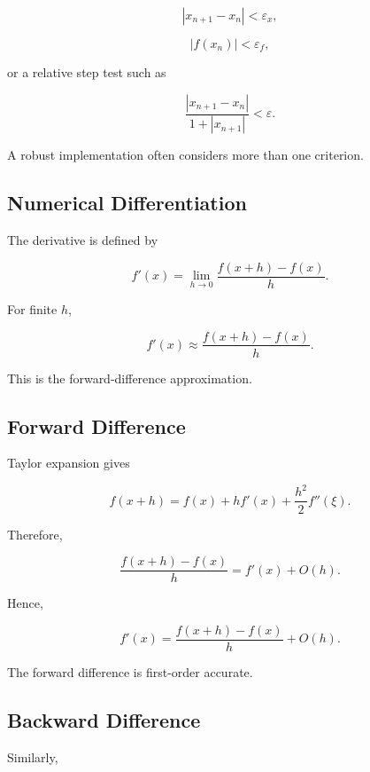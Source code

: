 \[
\boxed{
|x_{n+1}-x_n|
<
\varepsilon_x,
}
\]

\[
\boxed{
|f(x_n)|
<
\varepsilon_f,
}
\]

or a relative step test such as

\[
\boxed{
\frac{
|x_{n+1}-x_n|
}{
1+|x_{n+1}|
}
<
\varepsilon.
}
\]

A robust implementation often considers more than one criterion.

\subsection{Numerical Differentiation}
\label{subsec:numerical-differentiation}

The derivative is defined by

\[
f'(x)
=
\lim_{h\to0}
\frac{
f(x+h)-f(x)
}{
h
}.
\]

For finite \(h\),

\[
\boxed{
f'(x)
\approx
\frac{
f(x+h)-f(x)
}{
h
}.
}
\]

This is the forward-difference approximation.

\subsection{Forward Difference}
\label{subsec:forward-difference}

Taylor expansion gives

\[
f(x+h)
=
f(x)
+
hf'(x)
+
\frac{h^2}{2}f''(\xi).
\]

Therefore,

\[
\frac{
f(x+h)-f(x)
}{
h
}
=
f'(x)
+
O(h).
\]

Hence,

\[
\boxed{
f'(x)
=
\frac{
f(x+h)-f(x)
}{
h
}
+
O(h).
}
\]

The forward difference is first-order accurate.

\subsection{Backward Difference}
\label{subsec:backward-difference}

Similarly,

